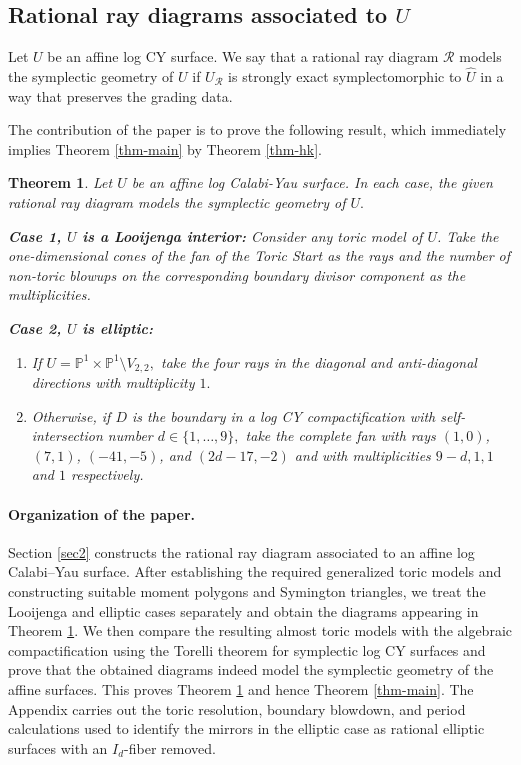 \documentclass[11pt, reqno]{amsart}
\newtheorem{theorem}{Theorem}[section]
\theoremstyle{definition}
\begin{document}
\subsection{Rational ray diagrams associated to $U$}

Let $U$ be an affine log CY surface. We say that a rational ray diagram $\mathcal{R}$ models the symplectic geometry of $U$ if $U_\mathcal{R}$ is strongly exact symplectomorphic to $\widehat{U}$ in a way that preserves the grading data.

The contribution of the paper is to prove the following result, which immediately implies Theorem \ref{thm-main} by Theorem \ref{thm-hk}.


\begin{theorem}\label{thm-ray} Let $U$ be an affine log Calabi-Yau surface. In each case, the given rational ray diagram models the symplectic geometry of $U.$

\textbf{Case 1, $U$ is a Looijenga interior:} Consider any toric model of $U$. Take the one-dimensional cones of the fan of the Toric Start as the rays and the number of non-toric blowups on the corresponding boundary divisor component as the multiplicities.

\pagebreak
\textbf{Case 2, $U$ is elliptic:} 
\begin{enumerate}
    \item If $U= \mathbb{P}^1\times \mathbb{P}^1\setminus V_{2,2},$ take the four rays in the diagonal and anti-diagonal directions with multiplicity $1.$
    \item Otherwise, if $D$ is the boundary in a log CY compactification with self-intersection number $d\in \{1,\ldots,9\},$  take the complete fan with rays  $(1, 0)$, $(7, 1)$, $(-41, -5)$, and $(2d - 17, -2)$ and with multiplicities $9-d,1,1$ and $1$ respectively.
\end{enumerate}


\end{theorem}

\paragraph{\textbf{Organization of the paper.}}
Section \ref{sec2} constructs the rational ray diagram associated to an affine log Calabi--Yau surface. After establishing the required generalized toric models and constructing suitable moment polygons and Symington triangles, we treat the Looijenga and elliptic cases separately and obtain the diagrams appearing in Theorem \ref{thm-ray}. We then compare the resulting almost toric models with the algebraic compactification using the Torelli theorem for symplectic log CY surfaces and prove that the obtained diagrams indeed model the symplectic geometry of the affine surfaces. This proves Theorem \ref{thm-ray} and hence Theorem \ref{thm-main}. The Appendix carries out the toric resolution, boundary blowdown, and period calculations used to identify the mirrors in the elliptic case as rational elliptic surfaces with an $I_d$-fiber removed.
\end{document}
